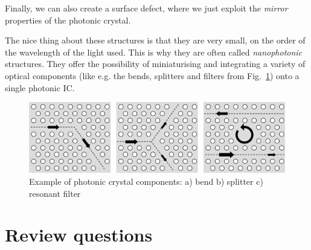 Finally, we can also create a surface defect, where we just exploit the \emph{mirror} properties of the photonic crystal.

The nice thing about these structures is that they are very small, on the order of the wavelength of the light used. This is why they are often called \emph{nanophotonic} structures. They offer the possibility of miniaturising and integrating a variety of optical components (like e.g. the bends, splitters and filters from Fig.~\ref{fig-components}) onto a single photonic IC.

\begin{figure}
\centering
\includegraphics{symmetry/figures/2d_components}
\caption{Example of photonic crystal components: a) bend b) splitter c) resonant filter}
\label{fig-components}
\end{figure}


\section*{Review questions}

